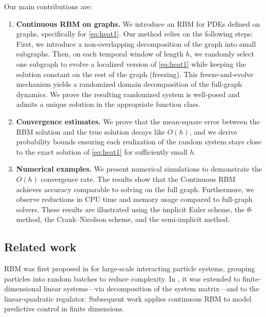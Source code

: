 \documentclass[a4paper, 10pt, english]{article}
\begin{document}
Our main contributions are:
\begin{enumerate}
  \item \textbf{Continuous RBM on graphs.} We introduce an RBM for PDEs defined on graphs, specifically for \eqref{eq:heat1}. Our method relies on the following steps: First, we introduce a non‐overlapping decomposition of the graph into small subgraphs. Then, on each temporal window of length $h$, we randomly select one subgraph to evolve a localized version of \eqref{eq:heat1} while keeping the solution constant on the rest of the graph (freezing).  This freeze-and-evolve mechanism yields a randomized domain decomposition of the full-graph dynamics. We prove the resulting randomized system is well-posed and admits a unique solution in the appropriate function class.


  \item \textbf{Convergence estimates.}  
    We prove that the mean‐square error between the RBM solution and the true solution decays like $O(h)$, and we derive probability bounds ensuring each realization of the random system stays close to the exact solution of \eqref{eq:heat1} for sufficiently small $h$.

\item \textbf{Numerical examples.}
We present numerical simulations to demonstrate the $O(h)$ convergence rate. The results show that the Continuous RBM achieves accuracy comparable to solving on the full graph. Furthermore, we observe reductions in CPU time and memory usage compared to full-graph solvers. These results are illustrated using the implicit Euler scheme, the $\theta$-method, the Crank–Nicolson scheme, and the semi-implicit method.
\end{enumerate}



\subsection{Related work}\label{sec:rel_literature}

RBM was first proposed in \cite{ShietalRBM,MR4230431} for large‐scale interacting particle systems, grouping particles into random batches to reduce complexity. In \cite{MR4433122}, it was extended to finite‐dimensional linear systems—via decomposition of the system matrix—and to the linear‐quadratic regulator. Subsequent work \cite{MR4307003,veldman2023stability} applies continuous RBM to model predictive control in finite dimensions.
\end{document}
